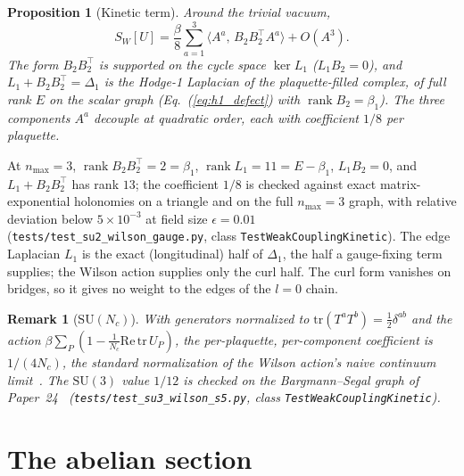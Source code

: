 \documentclass[11pt]{article}
\newtheorem{proposition}{Proposition}
\newtheorem{remark}{Remark}
\begin{document}
\begin{proposition}[Kinetic term]
\label{prop:L1_kinetic}
Around the trivial vacuum,
\begin{equation}
S_W[U]=\frac{\beta}{8}\sum_{a=1}^{3}\bigl\langle A^a,\,B_2B_2^{\top}A^a\bigr\rangle
+O(A^3).
\label{eq:L1_kinetic_form}
\end{equation}
The form $B_2B_2^{\top}$ is supported on the cycle space $\ker L_1$
($L_1B_2=0$), and $L_1+B_2B_2^{\top}=\Delta_1$ is the Hodge-1 Laplacian of the
plaquette-filled complex, of full rank $E$ on the scalar graph
(Eq.~(\ref{eq:h1_defect}) with $\operatorname{rank}B_2=\beta_1$).  The three
components $A^a$ decouple at quadratic order, each with coefficient
$1/8$ per plaquette.
\end{proposition}

At $n_{\max}=3$, $\operatorname{rank}B_2B_2^{\top}=2=\beta_1$,
$\operatorname{rank}L_1=11=E-\beta_1$, $L_1B_2=0$, and $L_1+B_2B_2^{\top}$ has
rank $13$; the coefficient $1/8$ is checked against exact
matrix-exponential holonomies on a triangle and on the full $n_{\max}=3$
graph, with relative deviation below $5\times10^{-3}$ at field size
$\epsilon=0.01$ (\texttt{tests/test\_su2\_wilson\_gauge.py}, class
\texttt{TestWeakCouplingKinetic}).  The edge Laplacian $L_1$ is the exact
(longitudinal) half of $\Delta_1$, the half a gauge-fixing term supplies;
the Wilson action supplies only the curl half.  The curl form vanishes on
bridges, so it gives no weight to the edges of the $l=0$ chain.

\begin{remark}[$\mathrm{SU}(N_c)$]
\label{rem:sun_coefficient}
With generators normalized to $\mathrm{tr}(T^aT^b)=\tfrac12\delta^{ab}$ and
the action $\beta\sum_P(1-\frac{1}{N_c}\mathrm{Re}\,\mathrm{tr}\,U_P)$, the
per-plaquette, per-component coefficient is $1/(4N_c)$, the standard
normalization of the Wilson action's naive continuum
limit~\cite{rothe2012}.  The $\mathrm{SU}(3)$ value $1/12$ is checked on the
Bargmann--Segal graph of Paper~24~\cite{paper24}
(\texttt{tests/test\_su3\_wilson\_s5.py}, class
\texttt{TestWeakCouplingKinetic}).
\end{remark}

\section{The abelian section}
\label{sec:abelian}
\end{document}
